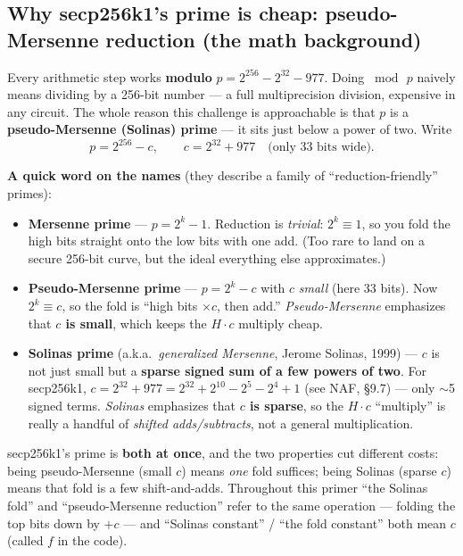 \documentclass[11pt,a4paper]{article}
\begin{document}
\subsection{Why secp256k1's prime is cheap: pseudo-Mersenne reduction (the math background)}
\label{sec:pmmath}

Every arithmetic step works \textbf{modulo} $p = 2^{256} - 2^{32} - 977$. Doing $\bmod\,p$ naively
means dividing by a 256-bit number --- a full multiprecision division, expensive in any circuit. The
whole reason this challenge is approachable is that $p$ is a \textbf{pseudo-Mersenne (Solinas) prime}
--- it sits just below a power of two. Write
\[
  p = 2^{256} - c, \qquad c = 2^{32} + 977 \quad\text{(only 33 bits wide)}.
\]

\textbf{A quick word on the names} (they describe a family of ``reduction-friendly'' primes):
\begin{itemize}
  \item \textbf{Mersenne prime} --- $p = 2^k - 1$. Reduction is \emph{trivial}: $2^k \equiv 1$, so you
    fold the high bits straight onto the low bits with one add. (Too rare to land on a secure 256-bit
    curve, but the ideal everything else approximates.)
  \item \textbf{Pseudo-Mersenne prime} --- $p = 2^k - c$ with $c$ \emph{small} (here 33 bits). Now
    $2^k \equiv c$, so the fold is ``high bits $\times c$, then add.'' \emph{Pseudo-Mersenne}
    emphasizes that \textbf{$c$ is small}, which keeps the $H\cdot c$ multiply cheap.
  \item \textbf{Solinas prime} (a.k.a.\ \emph{generalized Mersenne}, Jerome Solinas, 1999) --- $c$ is
    not just small but a \textbf{sparse signed sum of a few powers of two}. For secp256k1,
    $c = 2^{32} + 977 = 2^{32} + 2^{10} - 2^{5} - 2^{4} + 1$ (see NAF, \S9.7) --- only $\sim$5 signed
    terms. \emph{Solinas} emphasizes that \textbf{$c$ is sparse}, so the $H\cdot c$ ``multiply'' is
    really a handful of \emph{shifted adds/subtracts}, not a general multiplication.
\end{itemize}
secp256k1's prime is \textbf{both at once}, and the two properties cut different costs: being
pseudo-Mersenne (small $c$) means \emph{one} fold suffices; being Solinas (sparse $c$) means that fold
is a few shift-and-adds. Throughout this primer ``the Solinas fold'' and ``pseudo-Mersenne
reduction'' refer to the same operation --- folding the top bits down by $+c$ --- and ``Solinas
constant'' / ``the fold constant'' both mean $c$ (called $f$ in the code).
\end{document}
